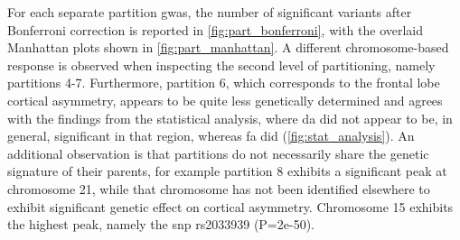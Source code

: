 For each separate partition \ac{gwas}, the number of significant variants after Bonferroni correction is reported in \autoref{fig:part_bonferroni}, with the overlaid Manhattan plots shown  in \autoref{fig:part_manhattan}. A different chromosome-based response is observed when inspecting the second level of partitioning, namely partitions 4-7. Furthermore, partition 6, which corresponds to the frontal lobe cortical asymmetry, appears to be quite less genetically determined and agrees with the findings from the statistical analysis, where \ac{da} did not appear to be, in general, significant in that region, whereas \ac{fa} did (\autoref{fig:stat_analysis}). An additional observation is that partitions do not necessarily share the genetic signature of their parents, for example partition 8 exhibits a significant peak at chromosome 21, while that chromosome has not been identified elsewhere to exhibit significant genetic effect on cortical asymmetry.  Chromosome 15 exhibits the highest peak, namely the \ac{snp} rs2033939 (P=2e-50).

